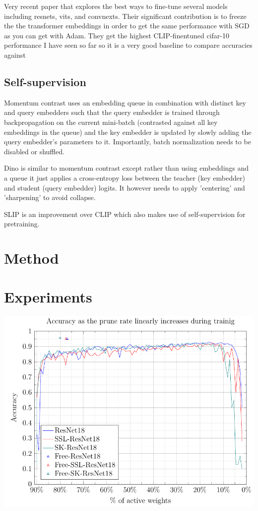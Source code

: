 \documentclass[12pt]{report}
\begin{document}
    Very recent paper that explores the best ways to fine-tune several models including resnets, vits, and convnexts.
    Their significant contribution is to freeze the the transformer embeddings in order to get the same performance with SGD as you can get with Adam. They get the highest CLIP-finentuned cifar-10 performance I have seen so far so it is a very good baseline to compare accuracies against~\cite{kumarHowFineTuneVision2022}


    \section{Self-supervision}

    Momentum contrast uses an embedding queue in combination with distinct key and query embedders such that the query embedder is trained through backpropagation on the current mini-batch (contrasted against all key embeddings in the queue) and the key embedder is updated by slowly adding the query embedder's parameters to it. Importantly, batch normalization needs to be disabled or shuffled.~\cite{heMomentumContrastUnsupervised2020}

    Dino is similar to momentum contrast except rather than using embeddings and a queue it just applies a cross-entropy loss between the teacher (key embedder) and student (query embedder) logits. It however needs to apply 'centering' and 'sharpening' to avoid collapse.~\cite{caronEmergingPropertiesSelfSupervised2021a}

    SLIP is an improvement over CLIP which also makes use of self-supervision for pretraining.~\cite{muSLIPSelfsupervisionMeets2021}


    \chapter{Method}


    \chapter{Experiments}

    \includegraphics[width=1.0\textwidth]{plots/variant_sparsity.pdf}
\end{document}
